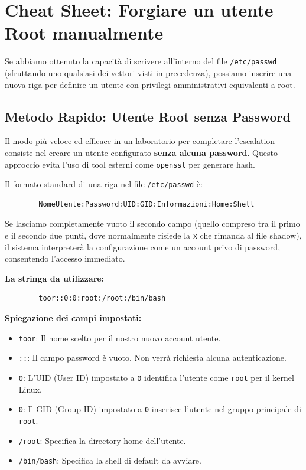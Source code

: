 \documentclass[12pt,a4paper]{report}
\begin{document}
	\section{Cheat Sheet: Forgiare un utente Root manualmente}
	Se abbiamo ottenuto la capacità di scrivere all'interno del file \texttt{/etc/passwd} (sfruttando uno qualsiasi dei vettori visti in precedenza), possiamo inserire una nuova riga per definire un utente con privilegi amministrativi equivalenti a root.
	
	\subsection{Metodo Rapido: Utente Root senza Password}
	Il modo più veloce ed efficace in un laboratorio per completare l'escalation consiste nel creare un utente configurato \textbf{senza alcuna password}. Questo approccio evita l'uso di tool esterni come \texttt{openssl} per generare hash.
	
	Il formato standard di una riga nel file \texttt{/etc/passwd} è:
	\begin{lstlisting}
		NomeUtente:Password:UID:GID:Informazioni:Home:Shell
	\end{lstlisting}
	
	Se lasciamo completamente vuoto il secondo campo (quello compreso tra il primo e il secondo due punti, dove normalmente risiede la \texttt{x} che rimanda al file shadow), il sistema interpreterà la configurazione come un account privo di password, consentendo l'accesso immediato.
	
	\textbf{La stringa da utilizzare:}
	\begin{lstlisting}
		toor::0:0:root:/root:/bin/bash
	\end{lstlisting}
	
	\textbf{Spiegazione dei campi impostati:}
	\begin{itemize}
		\item \texttt{toor}: Il nome scelto per il nostro nuovo account utente.
		\item \texttt{::}: Il campo password è vuoto. Non verrà richiesta alcuna autenticazione.
		\item \texttt{0}: L'UID (User ID) impostato a \texttt{0} identifica l'utente come \texttt{root} per il kernel Linux.
		\item \texttt{0}: Il GID (Group ID) impostato a \texttt{0} inserisce l'utente nel gruppo principale di \texttt{root}.
		\item \texttt{/root}: Specifica la directory home dell'utente.
		\item \texttt{/bin/bash}: Specifica la shell di default da avviare.
	\end{itemize}
	
\end{document}

